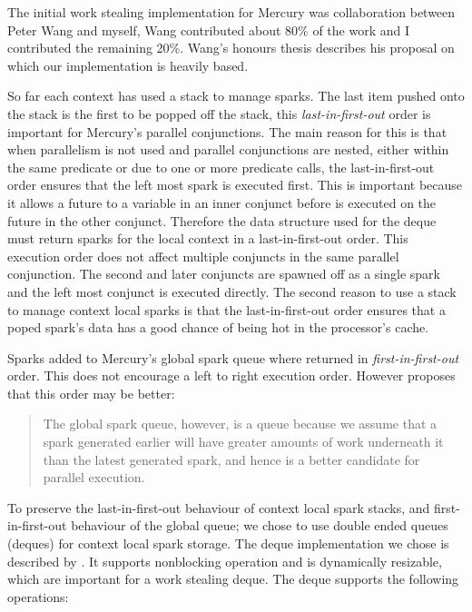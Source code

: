 The initial work stealing implementation for Mercury was collaboration
between Peter Wang and myself, Wang contributed about 80\% of the work
and I contributed the remaining 20\%.
Wang's honours thesis \citep{wang-hons} describes his proposal on which
our implementation is heavily based.

So far each context has used a stack to manage sparks.
The last item pushed onto the stack is the first to be popped off the
stack,
this \emph{last-in-first-out} order is important for Mercury's parallel
conjunctions.
The main reason for this is that when parallelism is not used and
parallel conjunctions are nested,
either within the same predicate
or due to one or more predicate calls,
the last-in-first-out order ensures that the left most spark is executed
first.
This is important because it allows a future to \signal a variable in an
inner conjunct before \wait is executed on the future in the other
conjunct.
Therefore the data structure used for the deque must return sparks
for the local context in a last-in-first-out order.
This execution order does not affect multiple conjuncts in the same
parallel conjunction.
The second and later conjuncts are spawned off as a single spark
and the left most conjunct is executed directly.
The second reason to use a stack to manage context local sparks
is that the last-in-first-out order ensures that a poped spark's data
has a good chance of being hot in the processor's cache.

Sparks added to Mercury's global spark queue where 
returned in \emph{first-in-first-out} order.
This does not encourage a left to right execution order.
However \citet{wang_hons} proposes that this order may be better:

\begin{quote}
The global spark queue, however, is a queue because we assume that a
spark generated earlier will have greater amounts of work underneath it
than the latest generated spark, and hence is a better candidate for
parallel execution.
\end{quote}

To preserve the last-in-first-out behaviour of context local spark
stacks,
and first-in-first-out behaviour of the global queue;
we chose to use double ended queues (deques) for context local spark
storage.
The deque implementation we chose 
is described by
\citet{Chase_2005_wsdeque}.
It supports nonblocking operation and is dynamically resizable,
which are important for a work stealing deque.
The deque supports the following operations:


